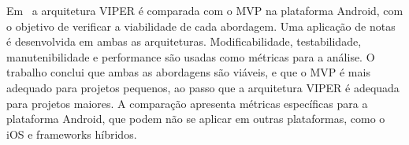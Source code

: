 Em~\cite{humeniuk} a arquitetura VIPER é comparada com o MVP na plataforma Android, com o objetivo de verificar a viabilidade de cada abordagem.
Uma aplicação de notas é desenvolvida em ambas as arquiteturas.
Modificabilidade, testabilidade, manutenibilidade e performance são usadas como métricas para a análise.
O trabalho conclui que ambas as abordagens são viáveis, e que o MVP é mais adequado para projetos pequenos, ao passo que a arquitetura VIPER é adequada para projetos maiores.
A comparação apresenta métricas específicas para a plataforma Android, que podem não se aplicar em outras plataformas, como o iOS e frameworks híbridos.